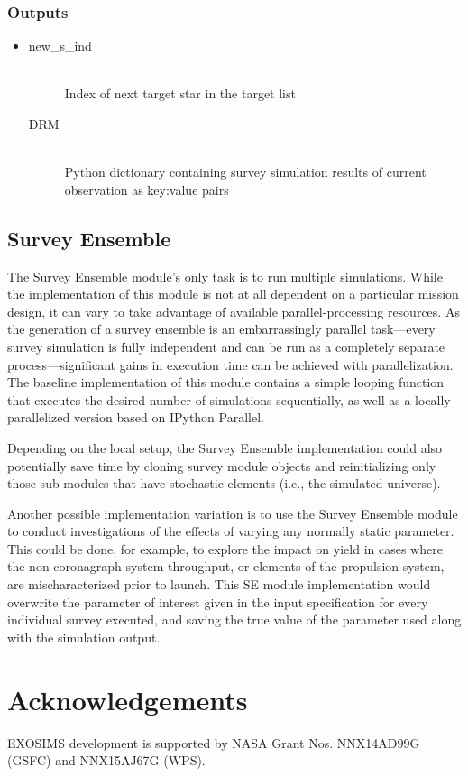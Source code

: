 \documentclass[cleanfoot]{asme2ej}
\begin{document}
\subsubsection*{Outputs}
\begin{itemize}
    \item 
    \begin{description}
        \item[new\_s\_ind] \hfill \\
        Index of next target star in the target list
        \item[DRM] \hfill \\
        Python dictionary containing survey simulation results of current observation as key:value pairs
    \end{description}
\end{itemize}


\subsection{Survey Ensemble}
The Survey Ensemble module's only task is to run multiple simulations.  While the implementation of this module is not at all dependent on a particular mission design, it can vary to take advantage of available parallel-processing resources.  As the generation of a survey ensemble is an embarrassingly parallel task---every survey simulation is fully independent and can be run as a completely separate process---significant gains in execution time can be achieved with parallelization.  The baseline implementation of this module contains a simple looping function that executes the desired number of simulations sequentially, as well as a locally parallelized version based on IPython Parallel.

Depending on the local setup, the Survey Ensemble implementation could also potentially save time by cloning survey module objects and reinitializing only those sub-modules that have stochastic elements (i.e., the simulated universe).

Another possible implementation variation is to use the Survey Ensemble module to conduct investigations of the effects of varying any normally static parameter.  This could be done, for example, to explore the impact on yield in cases where the non-coronagraph system throughput, or elements of the propulsion system, are mischaracterized prior to launch.  This SE module implementation would overwrite the parameter of interest given in the input specification for every individual survey executed, and saving the true value of the parameter used along with the simulation output.


\section*{Acknowledgements}  EXOSIMS development is supported by NASA Grant Nos. NNX14AD99G (GSFC) and NNX15AJ67G (WPS).
\end{document}
